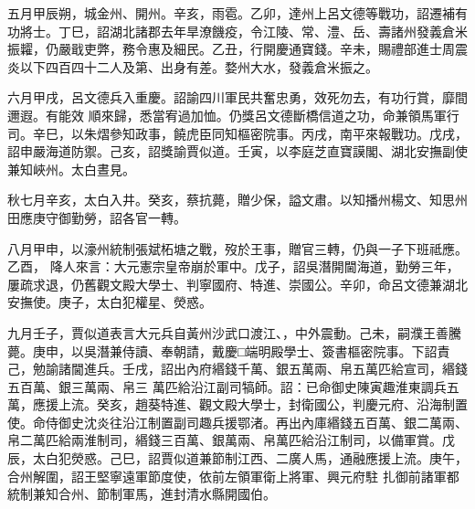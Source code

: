 \begin{pinyinscope}
 五月甲辰朔，城金州、開州。辛亥，雨雹。乙卯，達州上呂文德等戰功，詔遷補有功將士。丁巳，詔湖北諸郡去年旱潦饑疫，令江陵、常、澧、岳、壽諸州發義倉米振糶，仍嚴戢吏弊，務令惠及細民。乙丑，行開慶通寶錢。辛未，賜禮部進士周震炎以下四百四十二人及第、出身有差。婺州大水，發義倉米振之。



 六月甲戌，呂文德兵入重慶。詔諭四川軍民共奮忠勇，效死勿去，有功行賞，靡間邇遐。有能效
 順來歸，悉當宥過加恤。仍獎呂文德斷橋信道之功，命兼領馬軍行司。辛巳，以朱熠參知政事，饒虎臣同知樞密院事。丙戌，南平來報戰功。戊戌，詔申嚴海道防禦。己亥，詔獎諭賈似道。壬寅，以李庭芝直寶謨閣、湖北安撫副使兼知峽州。太白晝見。



 秋七月辛亥，太白入井。癸亥，蔡抗薨，贈少保，謚文肅。以知播州楊文、知思州田應庚守御勤勞，詔各官一轉。



 八月甲申，以濠州統制張斌柘塘之戰，歿於王事，贈官三轉，仍與一子下班祗應。乙酉，
 降人來言：大元憲宗皇帝崩於軍中。戊子，詔吳潛開閫海道，勤勞三年，屢疏求退，仍舊觀文殿大學士、判寧國府、特進、崇國公。辛卯，命呂文德兼湖北安撫使。庚子，太白犯權星、熒惑。



 九月壬子，賈似道表言大元兵自黃州沙武口渡江、，中外震動。己未，嗣濮王善騰薨。庚申，以吳潛兼侍讀、奉朝請，戴慶□端明殿學士、簽書樞密院事。下詔責己，勉諭諸閫進兵。壬戌，詔出內府緡錢千萬、銀五萬兩、帛五萬匹給宣司，緡錢五百萬、銀三萬兩、帛三
 萬匹給沿江副司犒師。詔：已命御史陳寅趣淮東調兵五萬，應援上流。癸亥，趙葵特進、觀文殿大學士，封衛國公，判慶元府、沿海制置使。命侍御史沈炎往沿江制置副司趣兵援鄂渚。再出內庫緡錢五百萬、銀二萬兩、帛二萬匹給兩淮制司，緡錢三百萬、銀萬兩、帛萬匹給沿江制司，以備軍賞。戊辰，太白犯熒惑。己巳，詔賈似道兼節制江西、二廣人馬，通融應援上流。庚午，合州解圍，詔王堅寧遠軍節度使，依前左領軍衛上將軍、興元府駐
 扎御前諸軍都統制兼知合州、節制軍馬，進封清水縣開國伯。




\end{pinyinscope}
